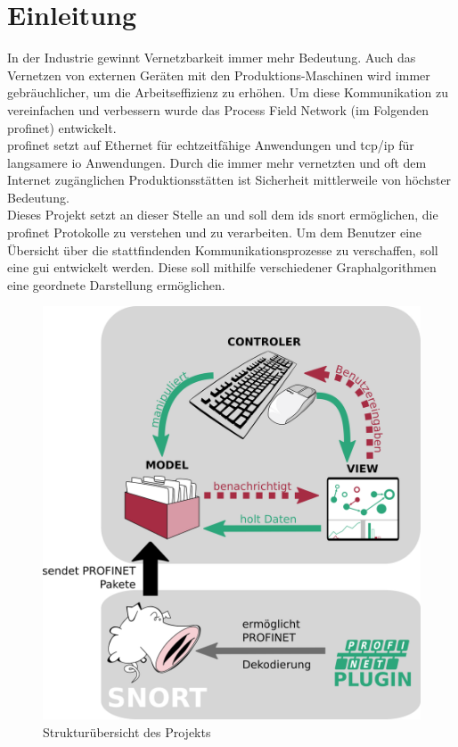 \chapter*{Einleitung}

In der Industrie gewinnt Vernetzbarkeit immer mehr Bedeutung. Auch das Vernetzen von externen Geräten mit den Produktions-Maschinen wird immer gebräuchlicher, um die Arbeitseffizienz zu erhöhen. Um diese Kommunikation zu vereinfachen und verbessern wurde das Process Field Network (im Folgenden \gls{profinet}) entwickelt.\\
\gls{profinet} setzt auf Ethernet für echtzeitfähige Anwendungen und \gls{tcp}/\gls{ip} für langsamere \gls{io} Anwendungen. Durch die immer mehr vernetzten und oft dem Internet zugänglichen Produktionsstätten ist Sicherheit mittlerweile von höchster Bedeutung. \\
Dieses Projekt setzt an dieser Stelle an und soll dem \gls{ids} \gls{snort} ermöglichen, die \gls{profinet} Protokolle zu verstehen und zu verarbeiten. Um dem Benutzer eine Übersicht über die stattfindenden Kommunikationsprozesse zu verschaffen, soll eine \gls{gui} entwickelt werden. Diese soll mithilfe verschiedener Graphalgorithmen eine geordnete Darstellung ermöglichen.

\begin{figure}
  \centering
  \includegraphics[width=\textwidth]{../diagrams/intro_diagram/g5171.png}
  \caption{Strukturübersicht des Projekts}\label{ASDF}
\end{figure} 